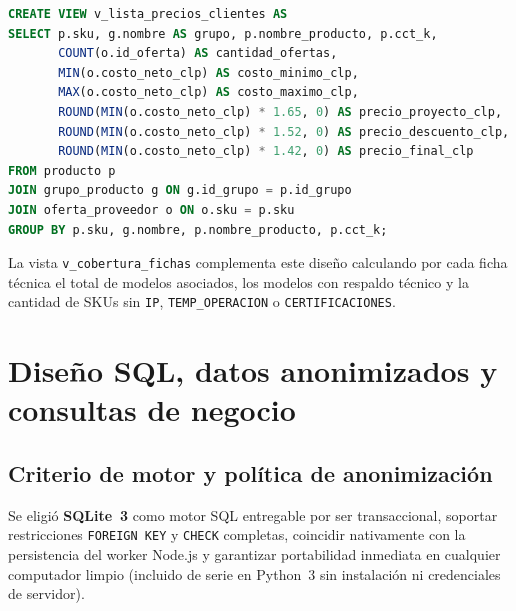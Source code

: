 \documentclass{article}
\begin{document}
\begin{lstlisting}[language=SQL,caption={Vistas calculadas en db/schema.sql (precios mínimos y cobertura crítica).}]
CREATE VIEW v_lista_precios_clientes AS
SELECT p.sku, g.nombre AS grupo, p.nombre_producto, p.cct_k,
       COUNT(o.id_oferta) AS cantidad_ofertas,
       MIN(o.costo_neto_clp) AS costo_minimo_clp,
       MAX(o.costo_neto_clp) AS costo_maximo_clp,
       ROUND(MIN(o.costo_neto_clp) * 1.65, 0) AS precio_proyecto_clp,
       ROUND(MIN(o.costo_neto_clp) * 1.52, 0) AS precio_descuento_clp,
       ROUND(MIN(o.costo_neto_clp) * 1.42, 0) AS precio_final_clp
FROM producto p
JOIN grupo_producto g ON g.id_grupo = p.id_grupo
JOIN oferta_proveedor o ON o.sku = p.sku
GROUP BY p.sku, g.nombre, p.nombre_producto, p.cct_k;
\end{lstlisting}

La vista \texttt{v\_cobertura\_fichas} complementa este diseño calculando por cada ficha técnica el total de modelos asociados, los modelos con respaldo técnico y la cantidad de SKUs sin \texttt{IP}, \texttt{TEMP\_OPERACION} o \texttt{CERTIFICACIONES}.

\section{Diseño SQL, datos anonimizados y consultas de negocio}

\subsection{Criterio de motor y política de anonimización}

Se eligió \textbf{SQLite~3} como motor SQL entregable por ser transaccional, soportar restricciones \texttt{FOREIGN KEY} y \texttt{CHECK} completas, coincidir nativamente con la persistencia del worker Node.js y garantizar portabilidad inmediata en cualquier computador limpio (incluido de serie en Python~3 sin instalación ni credenciales de servidor).
\end{document}
